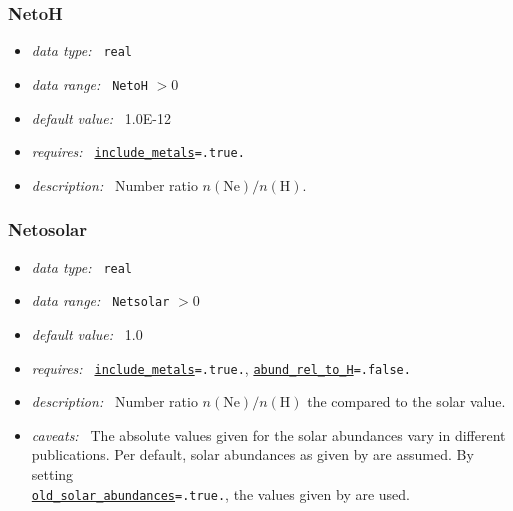 \documentclass[a4paper,10pt]{article}
\begin{document}
\subsubsection{NetoH}
\label{opt:netoh}
\begin{itemize}
 \item \textit{data type:~} \texttt{real}
 \item \textit{data range:~}  \texttt{NetoH} $> 0$
 \item \textit{default value:~} 1.0E-12
 \item \textit{requires:~} \texttt{\hyperref[opt:abundreltoh]{include\_metals}=.true.}
 \item \textit{description:~} Number ratio $n(\mathrm{Ne})/n(\mathrm{H})$.
\end{itemize}


\subsubsection{Netosolar}
\label{opt:netosolar}
\begin{itemize}
 \item \textit{data type:~} \texttt{real}
 \item \textit{data range:~}  \texttt{Netsolar} $> 0$
 \item \textit{default value:~} 1.0
 \item \textit{requires:~} \texttt{\hyperref[opt:includemetals]{include\_metals}=.true.},
 \texttt{\hyperref[opt:abundreltoh]{abund\_rel\_to\_H}=.false.}
 \item \textit{description:~} Number ratio $n(\mathrm{Ne})/n(\mathrm{H})$ the 
  compared to the solar value.
 \item \textit{caveats:~} The absolute values given for the solar abundances  
  vary in different publications. Per default, solar abundances as given 
  by \cite{Asplund2009} are assumed. By setting \\
  \texttt{\hyperref[opt:oldsolarabundances]{old\_solar\_abundances}=.true.}, 
  the values given by \cite{Grevesse1998} are used.
\end{itemize}
\end{document}
